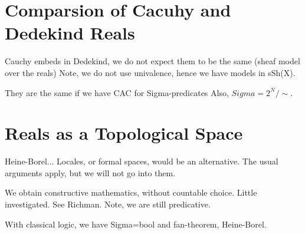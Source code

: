 \section{Comparsion of Cacuhy and Dedekind Reals}
\label{sec:comp-cacuhy-dedek}

Cauchy embeds in Dedekind, we do not expect them to be the same (sheaf model over the
reals) Note, we do not use univalence, hence we have models in sSh(X).

They are the same if we have CAC for Sigma-predicates
Also, $Sigma = 2^N/\sim$.


\section{Reals as a Topological Space}
\label{sec:reals-as-topological}

Heine-Borel... Locales, or formal spaces, would be an alternative. The usual arguments
apply, but we will not go into them.

We obtain constructive mathematics, without countable choice. Little investigated.
See Richman. Note, we are still predicative.

With classical logic, we have Sigma=bool and fan-theorem, Heine-Borel.


